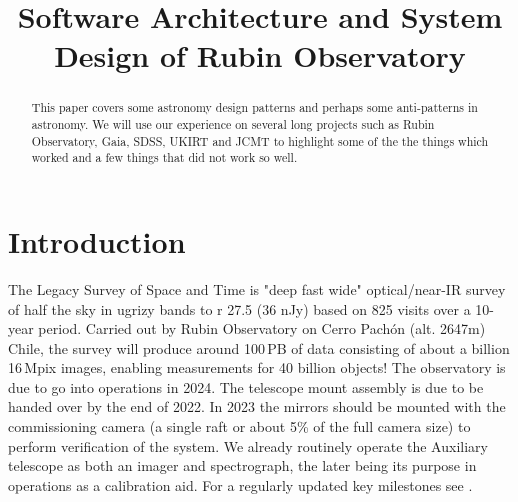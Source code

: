 \documentclass[11pt,twoside]{article}
\begin{document}

\title{Software Architecture and System Design of Rubin Observatory}







\begin{abstract}
This paper covers some astronomy design patterns and perhaps some anti-patterns in astronomy. We will use our experience on several long projects such as Rubin Observatory, Gaia, SDSS,  UKIRT and JCMT to highlight some of the the things which worked and a few things that did not work so well.
\end{abstract}

\section{Introduction}

The Legacy Survey of Space and Time \citep{2019ApJ...873..111I} is "deep fast wide" optical/near-IR survey of half the sky in ugrizy bands to r 27.5 (36 nJy) based on 825 visits over a 10-year period.
Carried out by Rubin Observatory on Cerro Pach\'{o}n (alt. 2647m) Chile, the survey will produce around 100\,PB of data consisting of about a billion 16\,Mpix images, enabling measurements for 40 billion objects!
The observatory is due to go into operations in 2024.
The telescope mount assembly is due to be handed over by the end of 2022.
In 2023 the mirrors should be mounted with the commissioning camera (a single raft or about 5\% of the full camera size) to perform verification of the system.
We already routinely operate the Auxiliary telescope as both an imager and spectrograph, the later being its purpose in operations as a calibration aid. For a regularly updated key milestones see \citep{DMTN-232}.
\end{document}
